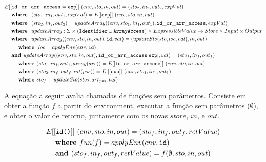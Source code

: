 \documentclass[12pt]{article}
\newcommand\eb[1]{[[\texttt{#1}]]}
\begin{document}
\begin{align*}
&E[[{\tt id\_or\_arr\_access = exp}]]\ (env,sto,in,out) = (sto_2,in_2,out_2,expVal) \\
&\hspace{3ex}\textbf{where }\ (sto_1,in_1,out_1,expVal) = E\eb{exp}\ (env, sto, in, out) \\
&\hspace{3ex}\textbf{where }\ (sto_2,in_2,out_2) = updateArray((env,sto_1,in_1,out_1),{\tt id\_or\_arr\_access}, expVal) \\
&\hspace{3ex}\textbf{where }\ updateArray : \Sigma \times (\texttt{Identifier} \cup \texttt{ArrayAccess}) \times ExpressibleValue \to Store \times Input \times Output \\
&\hspace{3ex}\textbf{where }\ updateArray( (env,sto,in,out), {\tt id}, val) = (updateSto(sto,loc,val), in, out)\\
&\hspace{6ex}\textbf{where }\ loc = applyEnv(env,{\tt id})\\
&\hspace{3ex}\textbf{and } updateArray((env,sto,in,out), {\tt id\_or\_arr\_access[exp]}, val) = (sto_f,in_f,out_f)\\
&\hspace{6ex}\textbf{where } (sto_1, in_1, out_1, array(arr)) = E\eb{id\_or\_arr\_access}\ (env, sto, in, out) \\
&\hspace{6ex}\textbf{where } (sto_2, in_f, out_f, int(pos)) = E\;\eb{exp}\ (env, sto_1, in_1, out_1) \\
&\hspace{6ex}\textbf{where } sto_f = updateSto(sto_2, arr_{pos}, val) \\
\end{align*}

A equação a seguir avalia chamadas de funções sem parâmetros. Consiste em obter a função $f$ a partir do environment, executar a função sem parâmetros ($\emptyset$), e obter o valor de retorno, juntamente com os novas $store$, $in$, e $out$.

\begin{align*}
&E\eb{id()}\ (env,sto,in,out) = (sto_f, in_f, out_f, retValue) \\
&\hspace{3ex}\textbf{where } fun(f) = applyEnv(env, \texttt{id}) \\
&\hspace{3ex}\textbf{and }(sto_f, in_f, out_f, retValue) = f(\emptyset, sto, in, out) \\
\end{align*}
\end{document}
